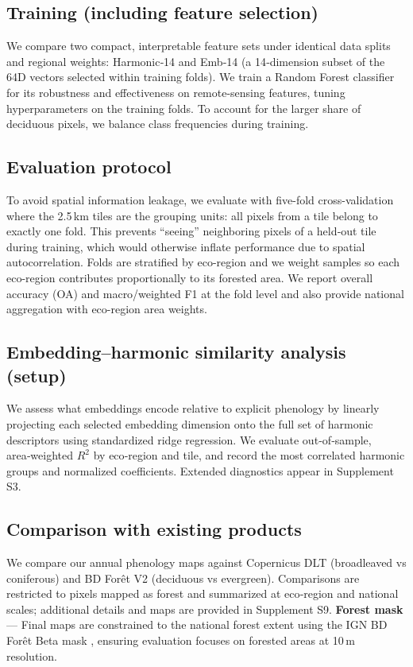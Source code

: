 \documentclass[utf8]{FrontiersinHarvard}
\begin{document}
\subsection{Training (including feature selection)}
We compare two compact, interpretable feature sets under identical data splits and regional weights: Harmonic‑14 and Emb‑14 (a 14‑dimension subset of the 64D vectors selected within training folds). We train a Random Forest classifier for its robustness and effectiveness on remote-sensing features, tuning hyperparameters on the training folds. To account for the larger share of deciduous pixels, we balance class frequencies during training.

\subsection{Evaluation protocol}
To avoid spatial information leakage, we evaluate with five-fold cross-validation where the 2.5\,km tiles are the grouping units: all pixels from a tile belong to exactly one fold. This prevents “seeing” neighboring pixels of a held‑out tile during training, which would otherwise inflate performance due to spatial autocorrelation. Folds are stratified by eco-region and we weight samples so each eco-region contributes proportionally to its forested area. We report overall accuracy (OA) and macro/weighted F1 at the fold level and also provide national aggregation with eco-region area weights.

\subsection{Embedding–harmonic similarity analysis (setup)}
We assess what embeddings encode relative to explicit phenology by linearly projecting each selected embedding dimension onto the full set of harmonic descriptors using standardized ridge regression. We evaluate out‑of‑sample, area‑weighted \(R^2\) by eco‑region and tile, and record the most correlated harmonic groups and normalized coefficients. Extended diagnostics appear in Supplement S3.

\subsection{Comparison with existing products}
We compare our annual phenology maps against Copernicus DLT (broadleaved vs coniferous) and BD Forêt V2 (deciduous vs evergreen). Comparisons are restricted to pixels mapped as forest and summarized at eco‑region and national scales; additional details and maps are provided in Supplement S9.
\textbf{Forest mask} — Final maps are constrained to the national forest extent using the IGN BD Forêt Beta mask \citep{IGN2024mask}, ensuring evaluation focuses on forested areas at 10\,m resolution.
\end{document}
